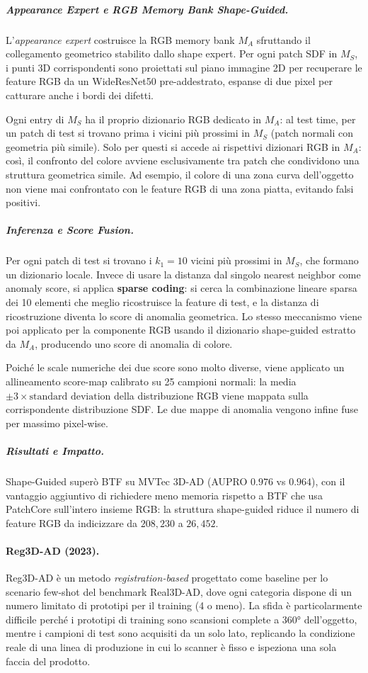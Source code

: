 \subparagraph{Appearance Expert e RGB Memory Bank Shape-Guided.}
L'\textit{ap\-pear\-ance expert} costruisce la RGB memory bank $M_A$ sfruttando il collegamento geometrico stabilito dallo shape expert. Per ogni patch SDF in $M_S$, i punti 3D corrispondenti sono proiettati sul piano immagine 2D per recuperare le feature RGB  da un WideResNet50 pre-addestrato, espanse di due pixel per catturare anche i bordi dei difetti. 

Ogni entry di $M_S$ ha il proprio dizionario RGB dedicato in $M_A$: al test time, per un patch di test si trovano prima i vicini più prossimi in $M_S$ (patch normali con geometria più simile). Solo per questi si accede ai rispettivi dizionari RGB in $M_A$: così, il confronto del colore avviene esclusivamente tra patch che condividono una struttura geometrica simile. Ad esempio, il colore di una zona curva dell'oggetto non viene mai confrontato con le feature RGB di una zona piatta, evitando falsi positivi.

\subparagraph{Inferenza e Score Fusion.}
Per ogni patch di test si trovano i $k_1 = 10$ vicini più prossimi in $M_S$, che formano un dizionario locale. Invece di usare la distanza dal singolo nearest neighbor come anomaly score, si applica \textbf{sparse coding}: si cerca la combinazione lineare sparsa dei 10 elementi che meglio ricostruisce la feature di test, e la distanza di ricostruzione diventa lo score di anomalia geometrica. Lo stesso meccanismo viene poi applicato per la componente RGB usando il dizionario shape-guided estratto da $M_A$, producendo uno score di anomalia di colore.

Poiché le scale numeriche dei due score sono molto diverse, viene applicato un allineamento score-map calibrato su 25 campioni normali: la media $\pm 3 \times \text{standard deviation}$ della distribuzione RGB viene mappata sulla corrispondente distribuzione SDF. Le due mappe di anomalia vengono infine fuse per massimo pixel-wise.

\subparagraph{Risultati e Impatto.}
Shape-Guided superò BTF su MVTec 3D-AD (AU\-PRO $0.976$ vs $0.964$), con il vantaggio aggiuntivo di richiedere meno memoria rispetto a BTF che usa PatchCore sull'intero insieme RGB: la struttura shape-guided riduce il numero di feature RGB da indicizzare da $208{,}230$
a $26{,}452$.

\paragraph{Reg3D-AD (2023).}
Reg3D-AD \cite{liu2023real3dad} è un metodo \textit{registration-based} progettato come baseline per lo scenario few-shot del benchmark Real3D-AD, dove ogni categoria dispone di un numero limitato di prototipi per il training (4 o meno). La sfida è particolarmente difficile perché i prototipi di training sono scansioni complete a 360° dell'oggetto, mentre i campioni di test sono acquisiti da un solo lato, replicando la condizione reale di una linea di produzione in cui lo scanner è fisso e ispeziona una sola faccia del prodotto.

